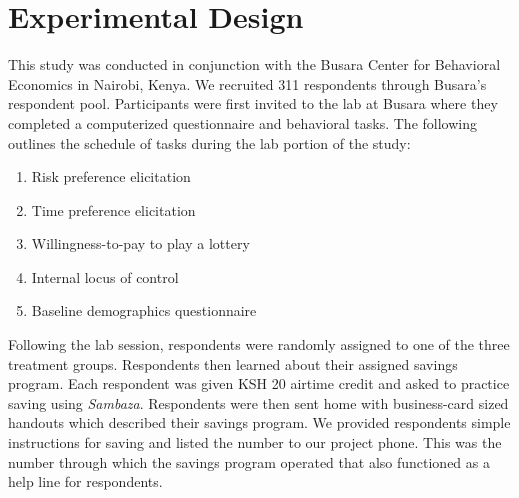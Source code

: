 \documentclass[10pt]{article}
\begin{document}





\section{Experimental Design} \label{sec:design}

	This study was conducted in conjunction with the Busara Center for Behavioral Economics in Nairobi, Kenya. We recruited 311 respondents through Busara’s respondent pool. Participants were first invited to the lab at Busara where they completed a computerized questionnaire and behavioral tasks. The following outlines the schedule of tasks during the lab portion of the study:

	\begin{enumerate}
	\item Risk preference elicitation 
	\item Time preference elicitation
	\item Willingness-to-pay to play a lottery
	\item Internal locus of control
	\item Baseline demographics questionnaire
	\end{enumerate}

	Following the lab session, respondents were randomly assigned to one of the three treatment groups. Respondents then learned about their assigned savings program. Each respondent was given KSH 20 airtime credit and asked to practice saving using \textit{Sambaza}. Respondents were then sent home with business-card sized handouts which described their savings program. We provided respondents simple instructions for saving and listed the number to our project phone. This was the number through which the savings program operated that also functioned as a help line for respondents.
\end{document}
